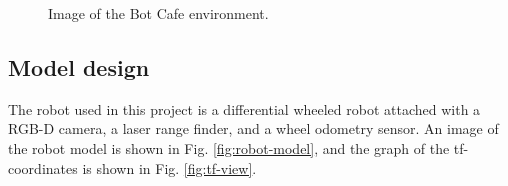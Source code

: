 \documentclass[10pt,journal,compsoc]{IEEEtran}
\begin{document}
\begin{figure}[thpb]
      \centering
      \vfill
      \caption{Image of the Bot Cafe environment.}
      \label{fig:personal-image}
\end{figure}

\subsection{Model design}
The robot used in this project is a differential wheeled robot attached with a RGB-D camera, a laser range finder, and a wheel odometry sensor. An image of the robot model is shown in Fig. \ref{fig:robot-model}, and the graph of the tf-coordinates is shown in Fig. \ref{fig:tf-view}.
\end{document}
